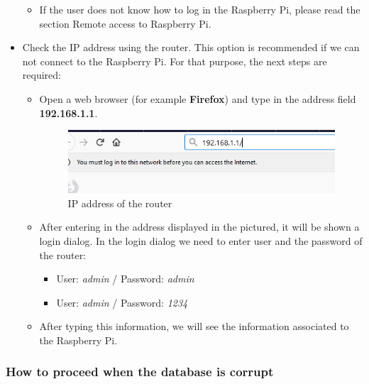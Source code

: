 \begin{itemize}
\begin{itemize}
\item If the user does not know how to log in the Raspberry Pi, please read the section Remote access to Raspberry Pi.

\end{itemize}

\item Check the IP address using the router. This option is recommended if we can not connect to the Raspberry Pi. For that purpose, the next steps are required:

\begin{itemize}

\item Open a web browser (for example \textbf{Firefox}) and type in the address field \textbf{192.168.1.1}.

\begin{figure}[H]
\begin{centering}
\includegraphics[scale=1]{IMGS/router_address.PNG}
\caption{IP address of the router \label{IP address of the router}}
\end{centering}
\end{figure} 

\item After entering in the address displayed in the pictured, it will be shown a login dialog. In the login dialog we need to enter user and the password of the router:

\begin{itemize}

\item User: \textit{admin} / Password: \textit{admin}
\item User: \textit{admin} / Password: \textit{1234}

\end{itemize}

\item After typing this information, we will see the information associated to the Raspberry Pi.

\end{itemize}

\end{itemize}

\subsubsection{How to proceed when the database is corrupt}

